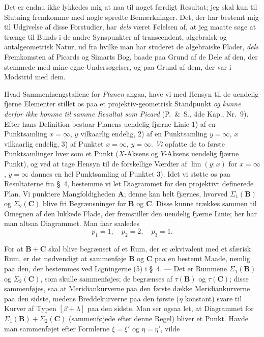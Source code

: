 \documentclass{article}
\begin{document}
Det er endnu ikke lykkedes mig at naa til noget færdigt Resultat; jeg skal kun til Slutning fremkomme med nogle spredte Bemærkninger. Det, der har bestemt mig til Udgivelse af disse Forstudier, har \emph{dels} været Følelsen af, at jeg maatte søge at trænge til Bunds i de andre Synspunkter af transcendent, algebraisk og antalgeometrisk Natur, ud fra hvilke man har studeret de algebraiske Flader, \emph{dels} Fremkomsten af Picards og Simarts Bog, baade paa Grund af de Dele af den, der stemmede med mine egne Undersøgelser, og paa Grund af dem, der var i Modstrid med dem.

Hvad Sammenhængstallene for \emph{Planen} angaa, have vi med Hensyn til de uendelig fjerne Elementer stillet os paa et projektiv-geometrisk Standpunkt \emph{og kunne derfor ikke komme til samme Resultat som Picard} (P.~\&~S., 4de Kap., Nr.~9). Efter hans Definition bestaar Planens uendelig fjærne Linie 1) af en Punktsamling $x = \infty$, $y$ vilkaarlig endelig, 2) af en Punktsamling $y = \infty$, $x$ vilkaarlig endelig, 3) af Punktet $x = \infty$, $y = \infty$. \emph{Vi} opfatte de to første Punktsamlinger hver som et Punkt ($X$-Aksens og $Y$-Aksens uendelig fjærne Punkt), og ved at tage Hensyn til de forskellige Værdier af $\lim(y:x)$ for $x = \infty$, $y = \infty$ dannes en hel Punktsamling af Punktet 3). Idet vi støtte os paa Resultaterne fra \S~4, bestemme vi let Diagrammet for den projektivt definerede Plan. Vi punktere Mangfoldigheden $\mathbf{A}$; denne kan helt fjærnes, hvorved $\Sigma_1(\mathbf{B})$ og $\Sigma_2(\mathbf{C})$ blive fri Begrænsninger for $\mathbf{B}$ og $\mathbf{C}$. Disse kunne trækkes sammen til Omegnen af den lukkede Flade, der fremstiller den uendelig fjærne Linie; her har man altsaa Diagrammet. Man faar saaledes
\[
p_1 = 1, \quad p_2 = 2, \quad p_3 = 1.
\]

For at $\mathbf{B} + \mathbf{C}$ skal blive begrænset af et Rum, der er ækvivalent med et sfærisk Rum, er det nødvendigt at sammenføje $\mathbf{B}$ og $\mathbf{C}$ paa en bestemt Maade, nemlig paa den, der bestemmes ved Ligningerne (5) i \S~4. --- Det er Rummene $\Sigma_1(\mathbf{B})$ og $\Sigma_2(\mathbf{C})$, som skulle sammenføjes; de begrænses af $\tau(\mathbf{B})$ og $\tau(\mathbf{C})$; disse sammenføjes, saa at Meridiankurverne paa den første dække Meridiankurverne paa den sidste, medens Breddekurverne paa den første ($\eta$ konstant) svare til Kurver af Typen $[\beta + \lambda]$ paa den sidste. Man ser ogsaa let, at Diagrammet for $\Sigma_1(\mathbf{B}) + \Sigma_2(\mathbf{C})$ (sammenføjede efter denne Regel) bliver et Punkt. Havde man sammenføjet efter Formlerne $\xi = \xi'$ og $\eta = \eta'$, vilde
\end{document}
